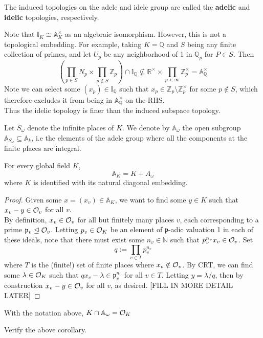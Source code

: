 \documentclass[11pt, x11names]{book}
\newcommand{\nn}{\mathbb{N}}
\newcommand{\zz}{\mathbb{Z}}
\newcommand{\qq}{\mathbb{Q}}
\newcommand{\rr}{\mathbb{R}}
\renewcommand{\aa}{\mathbb{A}}
\newcommand{\ii}{\mathbb{I}}
\newcommand{\pp}{\mathfrak{p}}
\renewcommand{\brack}[1]{\left(   #1 \right)}
\newcommand{\ideal}{\trianglelefteq}
\begin{document}
The induced topologies on the adele and idele group are called the \textbf{adelic} and \textbf{idelic} topologies, respectively.

\begin{remark}
Note that $\ii_K \cong \aa_K^\times$ as an algebraic isomorphism. However, this is not a topological embedding. For example, taking $K = \qq$ and $S$ being any finite collection of primes, and let $U_p$ be any neighborhood of 1 in $\qq_p$ for $P \in S$. Then
\begin{equation*}
    \brack{\prod_{p \in S}N_p \times \prod_{p \notin S}\zz_p} \cap \ii_\qq \nsubseteq \rr^\times \times \prod_{p < \infty} \zz_p^\times = \aa_\qq^\times 
\end{equation*}
Note we can select some $(x_p) \in \ii_\qq$ such that $x_p \in \zz_p \setminus \zz_p^\times$ for some $p \notin S$, which therefore excludes it from being in $\aa_\qq^\times$ on the RHS.\\
Thus the idelic topology is finer than the induced subspace topology.
\end{remark}

Let $S_\omega$ denote the infinite places of $K$. We denote by $\aa_\omega$ the open subgroup $\aa_{S_\omega} \subseteq \aa_k$, i.e the elements of the adele group where all the components at the finite places are integral.

\begin{theorem}[Approximation]
\label{Approximation Theorem}
For every global field $K$,
\begin{equation*}
    \aa_K = K + A_\omega
\end{equation*}
where $K$ is identified with its natural diagonal embedding.
\end{theorem}
\begin{proof}
Given some $x = (x_v) \in \aa_K$, we want to find some $y \in K$ such that $x_v - y \in \mathcal{O}_v$ for all $v$.\\
By definition, $x_v \in \mathcal{O}_v$ for all but finitely many places $v$, each corresponding to a prime $\pp_v \ideal \calo_v$. Letting $p_v \in \mathcal{O}_K$ be an element of $\pp$-adic valuation 1 in each of these ideals, note that there must exist some $n_v \in \nn$ such that $p_v^{n_v}x_v \in \mathcal{O}_v$. Set 
\begin{equation*}
    q := \prod_{v \in T} p_v^{n_v} 
\end{equation*}
where $T$ is the (finite!) set of finite places where $x_v \notin \mathcal{O}_v$. By CRT, we can find some $\lambda \in \mathcal{O}_K$ such that $qx_v - \lambda \in \pp_v^{n_v}$ for all $v \in T$. Letting $y = \lambda/q$, then by construction $x_v - y \in \mathcal{O}_v$ for all $v$, as desired. [FILL IN MORE DETAIL LATER]
\end{proof}
\begin{corollary}
    With the notation above, $K \cap \aa_\omega = \calo_K$
\end{corollary}
\begin{sanitycheck}
    Verify the above corollary.
\end{sanitycheck}
\end{document}
